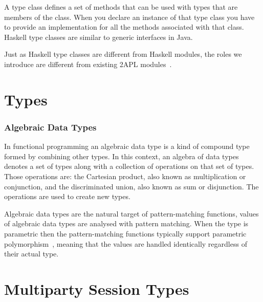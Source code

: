\documentclass[a4paper,12pt,oneside,fleqn]{book} %
\newcommand{\todo}[1]{[\textcolor{red}{TODO}: #1]}
\begin{document}
A type class defines a set of methods that can be used with types that are
members of the class. When you declare an instance of that type class
you have to provide an implementation for all the methods associated with
that class. Haskell type classes are similar to generic interfaces in Java.

Just as Haskell type classes are different from Haskell modules, the roles
we introduce are different from existing 2APL
modules~\cite{dblp:conf/prima/dastanims08}.
\chapter{Types}\label{ch:types} %
\subsection{Algebraic Data Types}\label{sec:adt} %

In functional programming an algebraic data type is a kind of compound type
formed by combining other types. In this context, an algebra of data types
denotes a set of types along with a collection of operations on that set of
types. Those operations are: the Cartesian product, also known as
multiplication or conjunction, and the discriminated union, also known as
sum or disjunction. The operations are used to create new types.

Algebraic data types are the natural target of pattern-matching functions,
values of algebraic data types are analysed with pattern matching.  When
the type is parametric then the pattern-matching functions typically
support parametric polymorphism~\cite{AlgebraicDT09}, meaning that the
values are handled identically regardless of their actual type.



\chapter{Multiparty Session Types} %

\end{document}
